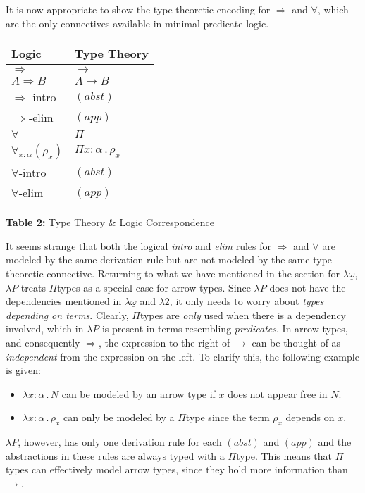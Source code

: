 \documentclass[9pt,preprint,nocopyrightspace,computermodern]{sigplanconf} %
\begin{document}
It is now appropriate to show the type theoretic encoding for \(\Rightarrow\) and \(\forall\),
which are the only connectives available in minimal predicate logic.%
\begin{center}
  \begin{tabu} {  X[c] | X[c]  }
    \textbf{Logic} & \textbf{Type Theory} \\[0.05cm]
    \hline
    \(\Rightarrow\)  & \(\rightarrow\)  \\[0.05cm]
    \hline
    \(A\Rightarrow B\)  & \(A\rightarrow B\)  \\[0.05cm]
    \hline
    \(\Rightarrow\)-intro  & \((abst)\)  \\[0.05cm]
    \hline
    \(\Rightarrow\)-elim  & \((app)\)  \\[0.05cm]
    \hline
    \hline
    \(\forall\)  & \(\Pi\)  \\[0.05cm]
    \hline
    \(\forall_ {x:\alpha} (\rho_x)\)  & \(\Pi x : \alpha\,.\,\rho_x\) \\[0.05cm]
    \hline
    \(\forall\)-intro  & \((abst)\)  \\[0.05cm]
    \hline
    \(\forall\)-elim  & \((app)\)  \\[0.05cm]
  \end{tabu}\par\smallskip
  \textbf{Table 2:} Type Theory \& Logic Correspondence
\end{center}
It seems strange that both the logical \textit{intro} and \textit{elim} rules for
\(\Rightarrow\) and \(\forall\) are modeled by the same derivation rule but are not
modeled by the same type theoretic connective. Returning to what we have mentioned in
the section for \(\lambda\underline\omega\), \(\lambda P\) treats \(\Pi\)types as a
special case for arrow types. Since \(\lambda P\) does not have the dependencies
mentioned in \(\lambda\underline\omega\) and \(\lambda 2\), it only needs to worry
about \textit{types depending on terms}. Clearly, \(\Pi\)types are \textit{only}
used when there is a dependency involved, which in \(\lambda P\) is present in terms
resembling \textit{predicates}. In arrow types, and consequently \(\Rightarrow\), the
expression to the right of \(\rightarrow\) can be thought of as \textit{independent}
from the expression on the left. To clarify this, the following example is given:
\begin{itemize}
\item \(\lambda x:\alpha\,.\,N\) can be modeled by an arrow type if \(x\)
  does not appear free in \(N\).
\item \(\lambda x:\alpha\,.\,\rho_x\) can only be modeled by a \(\Pi\)type since
  the term \(\rho_x\) depends on \(x\).
\end{itemize}
\(\lambda P\), however, has only one derivation rule for each \((abst)\) and \((app)\)
and the abstractions in these rules are always typed with a \(\Pi\)type. This means
that \(\Pi\)types can effectively model arrow types, since they hold more
information than \(\rightarrow\).
\end{document}
